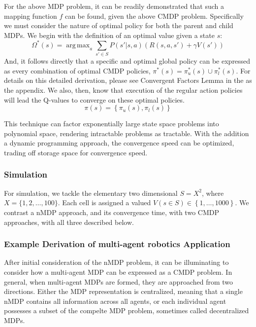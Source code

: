 \documentclass[compsoc,journal,letterpaper,10pt,draftclsnofoot,onecolumn]{IEEEtran}
\DeclareMathOperator*{\argmax}{arg\,max}
\begin{document}
For the above MDP problem, it can be readily demonstrated that such a
mapping function \(f\) can be found, given the above CMDP problem.
Specifically we must consider the nature of optimal policy for both the
parent and child MDPs. We begin with the definition of an optimal value
given a state \(s\):
\begin{equation}
\Omega^{*}(s) = \argmax_{a}\sum_{s' \in S}P\left( s'|s,a \right)\left( R\left( s, a, s' \right) + \gamma V\left( s' \right) \right)
\end{equation}
And, it follows directly that a specific and optimal global policy can
be expressed as every combination of optimal CMDP policies,
\(\pi^{*}\left( s \right) = \pi_{u}^{*}\left( s \right) \cup \pi_{l}^{*}\left( s \right)\).
For details on this detailed derivation, please see Convergent Factors
Lemma in the as the appendix. We also, then, know that execution of the
regular action policies will lead the Q-values to converge on these
optimal policies.
\begin{equation}
\pi\left( s \right) = \left\{ \pi_{u}\left( s \right),\pi_{l}\left( s \right) \right\}
\end{equation}

This technique can factor exponentially large state space problems into
polynomial space, rendering intractable problems as tractable. With the
addition a dynamic programming approach, the convergence speed can be
optimized, trading off storage space for convergence speed.

\subsubsection{Simulation}\label{simulation}

For simulation, we tackle the elementary two dimensional
\(S = X^{2}\), where \(X = \{ 1,2,\ldots,100\}\). Each cell is
assigned a valued
\(V\left( s \in S \right) \in \left\{ 1,\ldots,1000 \right\}\). We
contrast a nMDP approach, and its convergence time, with two CMDP
approaches, with all three described below.

\subsubsection{Example Derivation of multi-agent robotics
Application}\label{example-derivation-of-multi-agent-robotics-application}

After initial consideration of the nMDP problem, it can be illuminating
to consider how a multi-agent MDP can be expressed as a CMDP problem. In
general, when multi-agent MDPs are formed, they are approached from two
directions. Either the MDP representation is centralized, meaning that a
single nMDP contains all information across all agents, or each
individual agent possesses a subset of the compelte MDP problem,
sometimes called decentralized MDPs.
\end{document}
